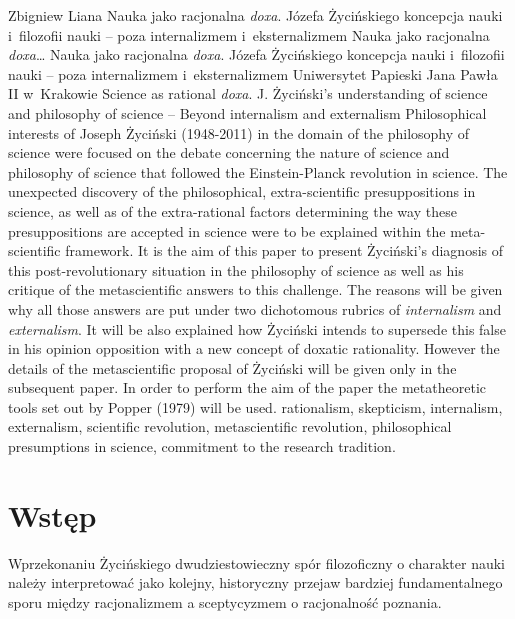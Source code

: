 \begin{artplenv}{Zbigniew Liana}
	{Nauka jako racjonalna \textit{doxa}. Józefa Życińskiego koncepcja nauki i~filozofii nauki -- poza internalizmem i~eksternalizmem}
	{Nauka jako racjonalna \textit{doxa}\ldots}
	{Nauka jako racjonalna \textit{doxa}. Józefa Życińskiego koncepcja nauki i~filozofii nauki -- poza internalizmem i~eksternalizmem}
	{Uniwersytet Papieski Jana Pawła II w~Krakowie}
	{Science as rational \textit{doxa}. J. Życiński’s understanding of science and philosophy of science -- Beyond internalism and externalism}
	{Philosophical interests of Joseph Życiński (1948-2011) in the domain of the philosophy of science were focused on the
		debate concerning the nature of science and philosophy of science that followed the Einstein-Planck revolution in
		science. The unexpected discovery of the philosophical, extra-scientific  presuppositions in science, as well as of the
		extra-rational factors determining the way these presuppositions are accepted in science were to be explained within
		the meta-scientific framework. It is the aim of this paper to present Życiński’s diagnosis of this post-revolutionary
		situation in the philosophy of science as well as his critique of the metascientific answers to this challenge. The
		reasons will be given why all those answers are put under two dichotomous rubrics of \textit{internalism} and
		\textit{externalism}. It will be also explained how Życiński intends to supersede this false in his opinion opposition
		with a new concept of doxatic rationality. However the details of the metascientific proposal of Życiński will be given
		only in the subsequent paper. In order to perform the aim of the paper the metatheoretic tools set out by Popper (1979)
		will be used.}
	{rationalism, skepticism, internalism, externalism, scientific revolution, metascientific revolution, philosophical
		presumptions in science, commitment to the research tradition.}


\section*{Wstęp}

\lettrine[loversize=0.13,lines=2,lraise=-0.05,nindent=0em,findent=0.2pt]%
{W}{}przekonaniu Życińskiego dwudziestowieczny spór filozoficzny o charakter nauki należy interpretować jako kolejny,
historyczny przejaw bardziej fundamentalnego sporu między racjonalizmem a sceptycyzmem o racjonalność poznania.


\end{artplenv}
